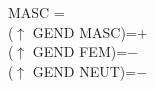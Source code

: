 \documentclass[output=paper]{langsci/langscibook}
\begin{document}
\ea\label{ex:mweiness:masc-template}
{\small 
MASC = \\
\hspace{2em}  ($\uparrow$ GEND MASC)=$+$ \\
\hspace{2em}  ($\uparrow$ GEND FEM)=$-$ \\
\hspace{2em}  ($\uparrow$ GEND NEUT)=$-$ \\
}
\z

%
%
%
%
\end{document}
